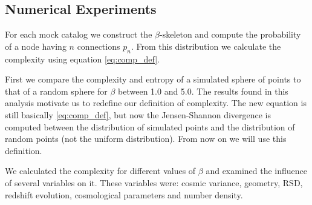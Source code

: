 \documentclass[fleqn,usenatbib]{mnras}
\begin{document}
\subsection{Numerical Experiments}

For each mock catalog we construct the $\beta$-skeleton and compute
the probability of a node having $n$ connections $p_n$. From this
distribution we calculate the complexity using equation
\ref{eq:comp_def}.  

First we compare the complexity and entropy of a simulated sphere of
points to that of a random sphere for $\beta$ between 1.0 and 5.0. The
results found in this analysis motivate us to redefine our definition
of complexity. The new equation is still basically \ref{eq:comp_def},
but now the Jensen-Shannon divergence is computed between the
distribution of simulated points and the distribution of random points
(not the uniform distribution). From now on we will use this
definition. 

We calculated the complexity for different values of $\beta$ and
examined the influence of several variables on it. These variables
were: cosmic variance, geometry, RSD, redshift evolution, cosmological
parameters and number density. 
\end{document}
